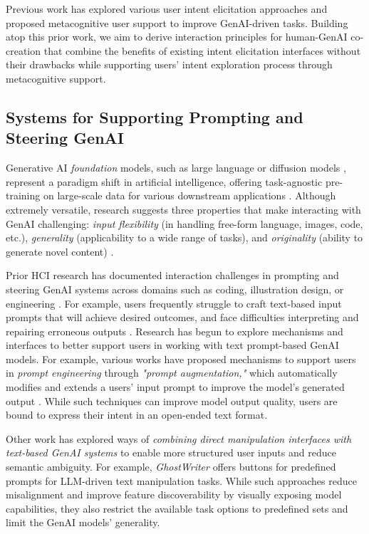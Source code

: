 Previous work has explored various  user intent elicitation approaches and proposed metacognitive user support to improve GenAI-driven tasks. 
Building atop this prior work, we aim to derive interaction principles for human-GenAI co-creation that combine the benefits of existing intent elicitation interfaces without their drawbacks while supporting users' intent exploration process through metacognitive support. 


\subsection{Systems for Supporting Prompting and Steering GenAI}

Generative AI \textit{foundation} models, such as large language or diffusion models \cite{bommasani_opportunities_2022,rombach_highresolution_2022}, represent a paradigm shift in artificial intelligence, offering task-agnostic pre-training on large-scale data for various downstream applications \cite{schneider_foundation_2022}. 
Although extremely versatile, research suggests three properties that make interacting with GenAI challenging: \textit{input flexibility} (in handling free-form language, images, code, etc.), \textit{generality} (applicability to a wide range of tasks), and \textit{originality} (ability to generate novel content) \cite{schellaert_your_2023}.

Prior HCI research has documented interaction challenges in prompting and steering GenAI systems across domains such as coding, illustration design, or engineering \cite{liu_what_2023,liu_opal_2022, gmeiner_exploring_2023}. 
For example, users frequently struggle to craft text-based input prompts that will achieve desired outcomes, and face difficulties interpreting and repairing erroneous outputs \cite{zamfirescu-pereira_why_2023}.
Research has begun to explore mechanisms and interfaces to better support users in working with text prompt-based GenAI models. 
For example, various works have proposed mechanisms to support users in \textit{prompt engineering} \cite{liu_pretrain_2021} through \textit{"prompt augmentation,"} which automatically modifies and extends a users' input prompt to improve the model's generated output \cite{brade_promptify_2023, shin_autoprompt_2020, betker_improving_2023}.
While such techniques can improve model output quality, users are bound to express their intent in an open-ended text format. 

Other work has explored ways of \textit{combining direct manipulation interfaces with text-based GenAI systems} to enable more structured user inputs and reduce semantic ambiguity. For example, \textit{GhostWriter} \cite{yeh_ghostwriter_2024} offers buttons for predefined prompts for LLM-driven text manipulation tasks. 
While such approaches reduce misalignment and improve feature discoverability by visually exposing model capabilities, they also restrict the available task options to predefined sets and limit the GenAI models' generality.

